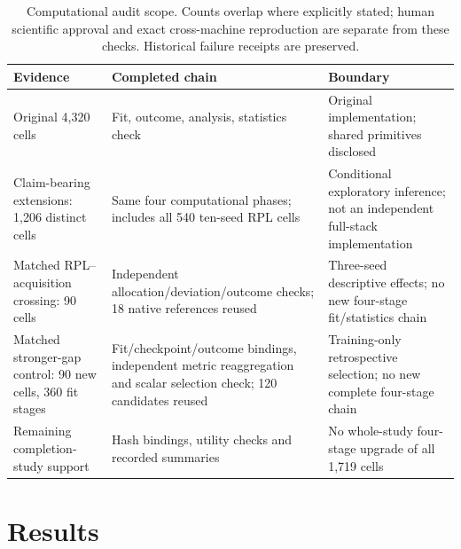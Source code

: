 \documentclass[11pt]{article}
\begin{document}
\begin{table}[tbp]\centering\small
\caption{Computational audit scope. Counts overlap where explicitly stated;
human scientific approval and exact cross-machine reproduction are separate
from these checks. Historical failure receipts are preserved.}
\label{tab:audit_levels}
\begin{tabular}{>{\raggedright\arraybackslash}p{}>{\raggedright\arraybackslash}p{}>{\raggedright\arraybackslash}p{}}\toprule
Evidence & Completed chain & Boundary\\\midrule
Original 4,320 cells & Fit, outcome, analysis, statistics check & Original implementation; shared primitives disclosed\\
Claim-bearing extensions: 1,206 distinct cells & Same four computational phases; includes all 540 ten-seed RPL cells & Conditional exploratory inference; not an independent full-stack implementation\\
Matched RPL--acquisition crossing: 90 cells & Independent allocation/deviation/outcome checks; 18 native references reused & Three-seed descriptive effects; no new four-stage fit/statistics chain\\
Matched stronger-gap control: 90 new cells, 360 fit stages & Fit/checkpoint/outcome bindings, independent metric reaggregation and scalar selection check; 120 candidates reused & Training-only retrospective selection; no new complete four-stage chain\\
Remaining completion-study support & Hash bindings, utility checks and recorded summaries & No whole-study four-stage upgrade of all 1,719 cells\\\bottomrule
\end{tabular}\end{table}
\section{Results}\label{sec:results}
\end{document}
